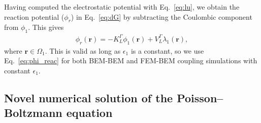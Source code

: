 %
%

Having computed the electrostatic potential with Eq.~\eqref{eq:lu}, we obtain the reaction potential ($\phi_r$) in Eq.~\eqref{eq:dG} by subtracting the Coulombic component from $\phi_1$. This gives\cite{CooperBardhanBarba2014}
%
\begin{align} \label{eq:phi_reac}
\phi_{r}(\mathbf{r}) = - K_{L}^{\Gamma} \phi_1(\mathbf{r}) + V_{L}^{\Gamma}  \lambda_1(\mathbf{r}),
\end{align}
%
where $\mathbf{r}\in\Omega_1$.
This is valid as long as $\epsilon_1$ is a constant, so we use Eq.~\eqref{eq:phi_reac} for both BEM-BEM and FEM-BEM coupling simulations with constant $\epsilon_1$.



\subsection*{\sffamily \large Novel numerical solution of the Poisson--Boltzmann equation}

